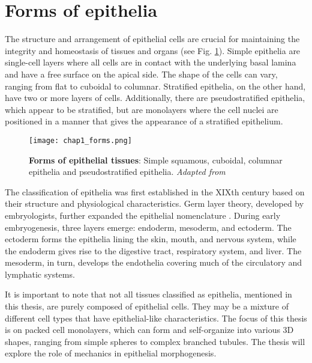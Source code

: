 %

\hypertarget{forms-of-epithelia}{%
	\section{Forms of epithelia}\label{forms-of-epithelia}}

The structure and arrangement of epithelial cells are crucial for maintaining the integrity and homeostasis of tissues and organs (see Fig. \ref{fig_1_5}). Simple epithelia are single-cell layers where all cells are in contact with the underlying basal lamina and have a free surface on the apical side. The shape of the cells can vary, ranging from flat to cuboidal to columnar. Stratified epithelia, on the other hand, have two or more layers of cells. Additionally, there are pseudostratified epithelia, which appear to be stratified, but are monolayers where the cell nuclei are positioned in a manner that gives the appearance of a stratified epithelium.

\begin{figure}[h]
	\centering
	\texttt{[image: chap1\_forms.png]}
	\caption{\label{fig_1_5} \textbf{Forms of epithelial tissues}: Simple squamous, cuboidal, columnar epithelia and pseudostratified epithelia. \textit{Adapted from \cite{zotero-9680}}}
\end{figure}

The classification of epithelia was first established in the XIXth century based on their structure and physiological characteristics. Germ layer theory, developed by embryologists, further expanded the epithelial nomenclature \cite{maccord2012}. During early embryogenesis, three layers emerge: endoderm, mesoderm, and ectoderm. The ectoderm forms the epithelia lining the skin, mouth, and nervous system, while the endoderm gives rise to the digestive tract, respiratory system, and liver. The mesoderm, in turn, develops the endothelia covering much of the circulatory and lymphatic systems.

It is important to note that not all tissues classified as epithelia, mentioned in this thesis, are purely composed of epithelial cells. They may be a mixture of different cell types that have epithelial-like characteristics. The focus of this thesis is on packed cell monolayers, which can form and self-organize into various 3D shapes, ranging from simple spheres to complex branched tubules. The thesis will explore the role of mechanics in epithelial morphogenesis.